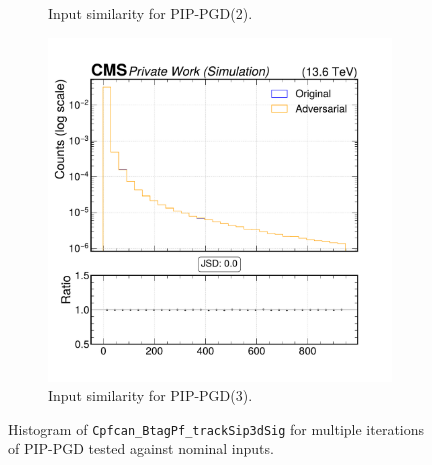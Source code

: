 \begin{figure}[h]
\begin{subfigure}[t]{0.32\textwidth}
    \caption*{Input similarity for PIP-PGD(2).}
  \end{subfigure}\hfill
  \begin{subfigure}[t]{0.32\textwidth}
    \includegraphics[width=\linewidth]{media/output/features/compare/combined_it_3/cmp_cpf_arr_Cpfcan_BtagPf_trackSip3dSig.pdf}
    \caption*{Input similarity for PIP-PGD(3).}
  \end{subfigure}

  \caption*{Histogram of \texttt{Cpfcan\_BtagPf\_trackSip3dSig} for multiple iterations of PIP-PGD tested against nominal inputs.}
  \label{fig:combined_input_Cpfcan_BtagPf_trackSip3dSig}
\end{figure}

